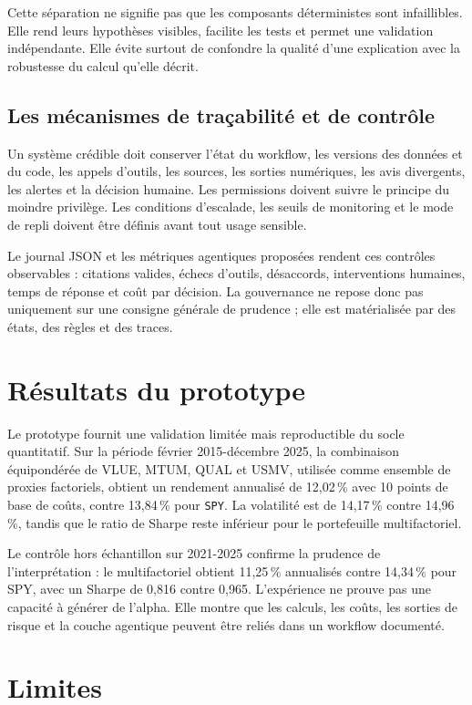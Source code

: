Cette séparation ne signifie pas que les composants déterministes sont infaillibles. Elle rend leurs hypothèses visibles, facilite les tests et permet une validation indépendante. Elle évite surtout de confondre la qualité d'une explication avec la robustesse du calcul qu'elle décrit.

\subsection{Les mécanismes de traçabilité et de contrôle}

Un système crédible doit conserver l'état du workflow, les versions des données et du code, les appels d'outils, les sources, les sorties numériques, les avis divergents, les alertes et la décision humaine. Les permissions doivent suivre le principe du moindre privilège. Les conditions d'escalade, les seuils de monitoring et le mode de repli doivent être définis avant tout usage sensible.

Le journal JSON et les métriques agentiques proposées rendent ces contrôles observables : citations valides, échecs d'outils, désaccords, interventions humaines, temps de réponse et coût par décision. La gouvernance ne repose donc pas uniquement sur une consigne générale de prudence ; elle est matérialisée par des états, des règles et des traces.

\section{Résultats du prototype}

Le prototype fournit une validation limitée mais reproductible du socle quantitatif. Sur la période février 2015-décembre 2025, la combinaison équipondérée de VLUE, MTUM, QUAL et USMV, utilisée comme ensemble de proxies factoriels, obtient un rendement annualisé de 12,02\,\% avec 10 points de base de coûts, contre 13,84\,\% pour \texttt{SPY}. La volatilité est de 14,17\,\% contre 14,96\,\%, tandis que le ratio de Sharpe reste inférieur pour le portefeuille multifactoriel.

Le contrôle hors échantillon sur 2021-2025 confirme la prudence de l'interprétation : le multifactoriel obtient 11,25\,\% annualisés contre 14,34\,\% pour SPY, avec un Sharpe de 0,816 contre 0,965. L'expérience ne prouve pas une capacité à générer de l'alpha. Elle montre que les calculs, les coûts, les sorties de risque et la couche agentique peuvent être reliés dans un workflow documenté.

\section{Limites}

